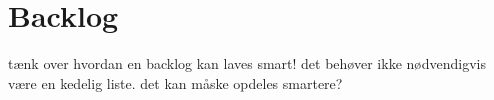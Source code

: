 \chapter{Backlog}
\label{chap:backlog}

t\ae{}nk over hvordan en backlog kan laves smart! det beh\o{}ver ikke nødvendigvis være en kedelig liste. det kan m\aa{}ske opdeles smartere?
